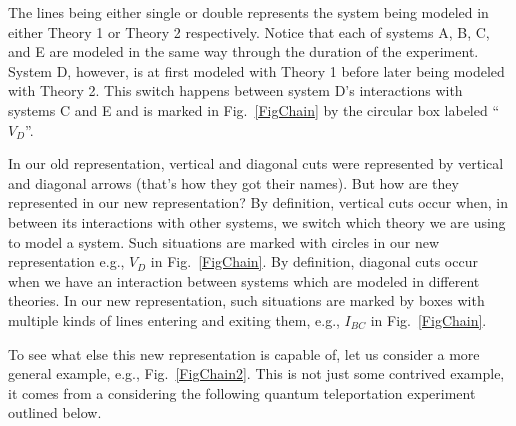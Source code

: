\documentclass[12pt,prd,superscriptaddress,floatfix,amsmath,amssymb,amsfonts,nofootinbib]{revtex4-2}
\begin{document}
The lines being either single or double represents the system being modeled in either Theory 1 or Theory 2 respectively. Notice that each of systems A, B, C, and E are modeled in the same way through the duration of the experiment. System D, however, is at first modeled with Theory 1 before later being modeled with Theory 2. This switch happens between system D's interactions with systems C and E and is marked in Fig.~\ref{FigChain} by the circular box labeled ``$V_D$''.

In our old representation, vertical and diagonal cuts were represented by vertical and diagonal arrows (that's how they got their names). But how are they represented in our new representation? By definition, vertical cuts occur when, in between its interactions with other systems, we switch which theory we are using to model a system. Such situations are  marked with circles in our new representation e.g., $V_{D}$ in Fig.~\ref{FigChain}. By definition, diagonal cuts occur when we have an interaction between systems which are modeled in different theories. In our new representation, such situations are marked by boxes with multiple kinds of lines entering and exiting them, e.g., $I_{BC}$ in Fig.~\ref{FigChain}.

To see what else this new representation is capable of, let us consider a more general example, e.g., Fig.~\ref{FigChain2}. This is not just some contrived example, it comes from a considering the following quantum teleportation experiment~\cite{Nielsen2000} outlined below. 
\end{document}
